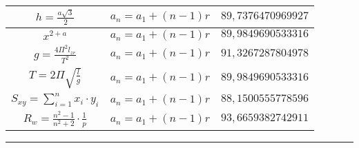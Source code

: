 \documentclass{article}
\begin{document}
\begin{flushleft}
\begin{longtable}{|c|c|c|}
$h=\frac{a\sqrt{3}}{2}$ & $a_n=a_1+(n-1)r$ & $89,7376470969927$ \\ \hline 
$x^{2+a}$ & $a_n=a_1+(n-1)r$ & $89,9849690533316$ \\ \hline 
$g=\frac{4\Pi ^2l_{zr}}{T^2}$ & $a_n=a_1+(n-1)r$ & $91,3267287804978$ \\ \hline 
$T=2\Pi \sqrt{\frac{l}{g}}$ & $a_n=a_1+(n-1)r$ & $89,9849690533316$ \\ \hline 
$S_{xy}=\sum_{i=1}^{n}x_i\cdot y_i$ & $a_n=a_1+(n-1)r$ & $88,1500555778596$ \\ \hline 
$R_w=\frac{n^2-1}{n^2+2}\cdot \frac{1}{p}$ & $a_n=a_1+(n-1)r$ & $93,6659382742911$ \\ \hline 
\end{longtable} 

\end{flushleft}
\hrule
\end{document}
